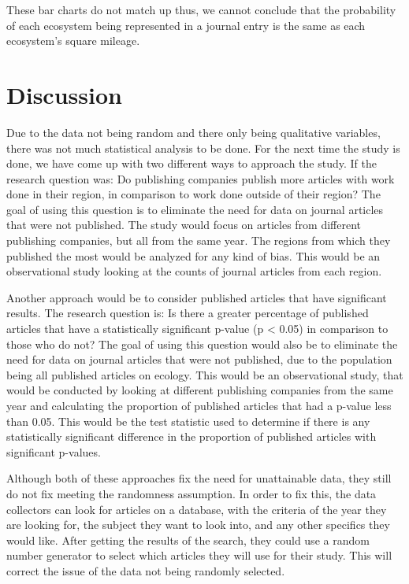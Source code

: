 \documentclass[
]{article}
\begin{document}
These bar charts do not match up thus, we cannot conclude that the
probability of each ecosystem being represented in a journal entry is
the same as each ecosystem's square mileage.

\hypertarget{discussion}{%
\section{Discussion}\label{discussion}}

Due to the data not being random and there only being qualitative
variables, there was not much statistical analysis to be done. For the
next time the study is done, we have come up with two different ways to
approach the study. If the research question was: Do publishing
companies publish more articles with work done in their region, in
comparison to work done outside of their region? The goal of using this
question is to eliminate the need for data on journal articles that were
not published. The study would focus on articles from different
publishing companies, but all from the same year. The regions from which
they published the most would be analyzed for any kind of bias. This
would be an observational study looking at the counts of journal
articles from each region.

Another approach would be to consider published articles that have
significant results. The research question is: Is there a greater
percentage of published articles that have a statistically significant
p-value (p \textless{} 0.05) in comparison to those who do not? The goal
of using this question would also be to eliminate the need for data on
journal articles that were not published, due to the population being
all published articles on ecology. This would be an observational study,
that would be conducted by looking at different publishing companies
from the same year and calculating the proportion of published articles
that had a p-value less than 0.05. This would be the test statistic used
to determine if there is any statistically significant difference in the
proportion of published articles with significant p-values.

Although both of these approaches fix the need for unattainable data,
they still do not fix meeting the randomness assumption. In order to fix
this, the data collectors can look for articles on a database, with the
criteria of the year they are looking for, the subject they want to look
into, and any other specifics they would like. After getting the results
of the search, they could use a random number generator to select which
articles they will use for their study. This will correct the issue of
the data not being randomly selected.
\end{document}
